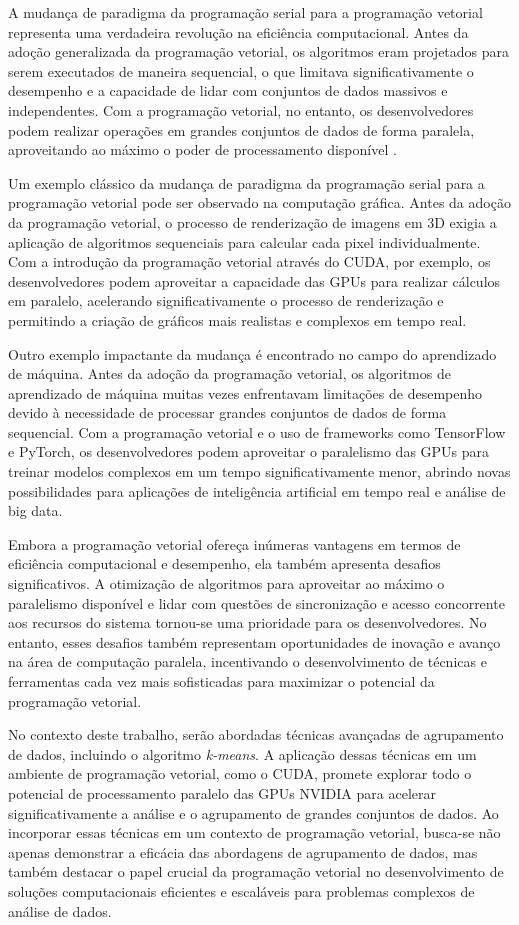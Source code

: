 \documentclass[12pt,
openright, 
oneside, %
a4paper,    %
brazil]{facom-ufu-abntex2}
\begin{document}
A mudança de paradigma da programação serial para a programação vetorial representa uma verdadeira revolução na eficiência computacional. Antes da adoção generalizada da programação vetorial, os algoritmos eram projetados para serem executados de maneira sequencial, o que limitava significativamente o desempenho e a capacidade de lidar com conjuntos de dados massivos e independentes. Com a programação vetorial, no entanto, os desenvolvedores podem realizar operações em grandes conjuntos de dados de forma paralela, aproveitando ao máximo o poder de processamento disponível \cite{hennessy2011}.

Um exemplo clássico da mudança de paradigma da programação serial para a programação vetorial pode ser observado na computação gráfica. Antes da adoção da programação vetorial, o processo de renderização de imagens em 3D exigia a aplicação de algoritmos sequenciais para calcular cada pixel individualmente. Com a introdução da programação vetorial através do CUDA, por exemplo, os desenvolvedores podem aproveitar a capacidade das GPUs para realizar cálculos em paralelo, acelerando significativamente o processo de renderização e permitindo a criação de gráficos mais realistas e complexos em tempo real.

Outro exemplo impactante da mudança é encontrado no campo do aprendizado de máquina. Antes da adoção da programação vetorial, os algoritmos de aprendizado de máquina muitas vezes enfrentavam limitações de desempenho devido à necessidade de processar grandes conjuntos de dados de forma sequencial. Com a programação vetorial e o uso de frameworks como TensorFlow e PyTorch, os desenvolvedores podem aproveitar o paralelismo das GPUs para treinar modelos complexos em um tempo significativamente menor, abrindo novas possibilidades para aplicações de inteligência artificial em tempo real e análise de big data.

Embora a programação vetorial ofereça inúmeras vantagens em termos de eficiência computacional e desempenho, ela também apresenta desafios significativos. A otimização de algoritmos para aproveitar ao máximo o paralelismo disponível e lidar com questões de sincronização e acesso concorrente aos recursos do sistema tornou-se uma prioridade para os desenvolvedores. No entanto, esses desafios também representam oportunidades de inovação e avanço na área de computação paralela, incentivando o desenvolvimento de técnicas e ferramentas cada vez mais sofisticadas para maximizar o potencial da programação vetorial.

No contexto deste trabalho, serão abordadas técnicas avançadas de agrupamento de dados, incluindo o algoritmo \textit{k-means}. A aplicação dessas técnicas em um ambiente de programação vetorial, como o CUDA, promete explorar todo o potencial de processamento paralelo das GPUs NVIDIA para acelerar significativamente a análise e o agrupamento de grandes conjuntos de dados. Ao incorporar essas técnicas em um contexto de programação vetorial, busca-se não apenas demonstrar a eficácia das abordagens de agrupamento de dados, mas também destacar o papel crucial da programação vetorial no desenvolvimento de soluções computacionais eficientes e escaláveis para problemas complexos de análise de dados.
\end{document}
